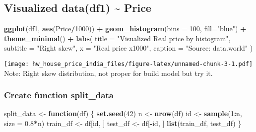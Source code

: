 \documentclass[
]{article}
\newenvironment{Shaded}{\begin{snugshade}}{\end{snugshade}}
\newcommand{\AttributeTok}[1]{\textcolor[rgb]{0.13,0.29,0.53}{#1}}
\newcommand{\ControlFlowTok}[1]{\textcolor[rgb]{0.13,0.29,0.53}{\textbf{#1}}}
\newcommand{\DecValTok}[1]{\textcolor[rgb]{0.00,0.00,0.81}{#1}}
\newcommand{\FloatTok}[1]{\textcolor[rgb]{0.00,0.00,0.81}{#1}}
\newcommand{\FunctionTok}[1]{\textcolor[rgb]{0.13,0.29,0.53}{\textbf{#1}}}
\newcommand{\NormalTok}[1]{#1}
\newcommand{\OtherTok}[1]{\textcolor[rgb]{0.56,0.35,0.01}{#1}}
\newcommand{\SpecialCharTok}[1]{\textcolor[rgb]{0.81,0.36,0.00}{\textbf{#1}}}
\newcommand{\StringTok}[1]{\textcolor[rgb]{0.31,0.60,0.02}{#1}}
\begin{document}
\hypertarget{visualized-datadf1-price}{%
\subsection{Visualized data(df1) \textasciitilde{}
Price}\label{visualized-datadf1-price}}

\begin{Shaded}
\begin{Highlighting}[]
\FunctionTok{ggplot}\NormalTok{(df1, }\FunctionTok{aes}\NormalTok{(Price}\SpecialCharTok{/}\DecValTok{1000}\NormalTok{)) }\SpecialCharTok{+}
  \FunctionTok{geom\_histogram}\NormalTok{(}\AttributeTok{bins =} \DecValTok{100}\NormalTok{, }\AttributeTok{fill=}\StringTok{"blue"}\NormalTok{) }\SpecialCharTok{+}
  \FunctionTok{theme\_minimal}\NormalTok{() }\SpecialCharTok{+}
  \FunctionTok{labs}\NormalTok{(}
    \AttributeTok{title =} \StringTok{"Visualized Real price by histogram"}\NormalTok{,}
    \AttributeTok{subtitle =} \StringTok{"Right skew"}\NormalTok{,}
    \AttributeTok{x =} \StringTok{"Real price x1000"}\NormalTok{,}
    \AttributeTok{caption =} \StringTok{"Source: data.world"}
\NormalTok{  )}
\end{Highlighting}
\end{Shaded}

\texttt{[image: hw\_house\_price\_india\_files/figure-latex/unnamed-chunk-3-1.pdf]}
Note: Right skew distribution, not proper for build model but try it.

\hypertarget{create-function-split_data}{%
\subsubsection{Create function
split\_data}\label{create-function-split_data}}

\begin{Shaded}
\begin{Highlighting}[]
\NormalTok{split\_data }\OtherTok{\textless{}{-}} \ControlFlowTok{function}\NormalTok{(df) \{}
  \FunctionTok{set.seed}\NormalTok{(}\DecValTok{42}\NormalTok{)}
\NormalTok{  n }\OtherTok{\textless{}{-}} \FunctionTok{nrow}\NormalTok{(df)}
\NormalTok{  id }\OtherTok{\textless{}{-}} \FunctionTok{sample}\NormalTok{(}\DecValTok{1}\SpecialCharTok{:}\NormalTok{n, }\AttributeTok{size =} \FloatTok{0.8}\SpecialCharTok{*}\NormalTok{n)}
\NormalTok{  train\_df }\OtherTok{\textless{}{-}}\NormalTok{ df[id, ]}
\NormalTok{  test\_df }\OtherTok{\textless{}{-}}\NormalTok{ df[}\SpecialCharTok{{-}}\NormalTok{id, ]}
  \FunctionTok{list}\NormalTok{(train\_df, test\_df)}
\NormalTok{\}}
\end{Highlighting}
\end{Shaded}
\end{document}
